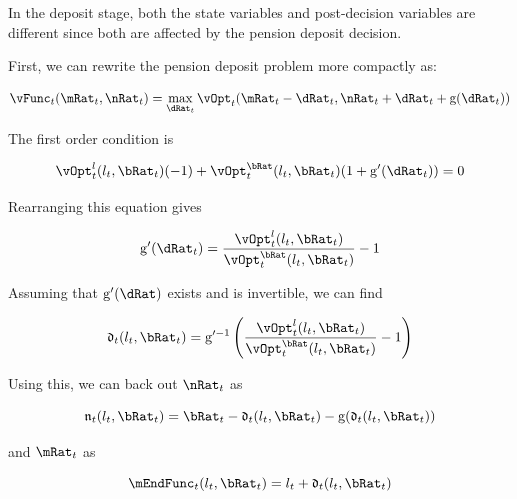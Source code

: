 \documentclass[\econtexRoot/EGMN]{subfiles}
\begin{document}
\providecommand{\gFunc}{\ensuremath{\mathrm{g}}}


In the deposit stage, both the state variables and post-decision variables are different since both are affected by the pension deposit decision.

First, we can rewrite the pension deposit problem more compactly as:

\begin{equation}
    \vFunc_{t}(\mRat_{t}, \nRat_{t}) = \max_{\dRat_{t}}
    \vOpt_{t}(\mRat_{t}
    - \dRat_{t}, \nRat_{t} + \dRat_{t} + \gFunc(\dRat_{t}))
\end{equation}

The first order condition is

\begin{equation}
    \vOpt_{t}^{\lRat}(\lRat_{t}, \bRat_{t})(-1) +
    \vOpt_{t}^{\bRat}(\lRat_{t}, \bRat_{t})(1+\gFunc'(\dRat_{t})) = 0
\end{equation}

Rearranging this equation gives

\begin{equation}
    \gFunc'(\dRat_{t}) = \frac{\vOpt_{t}^{\lRat}(\lRat_{t},
        \bRat_{t})}{\vOpt_{t}^{\bRat}(\lRat_{t}, \bRat_{t})} - 1
\end{equation}

Assuming that $\gFunc'(\dRat)$ exists and is invertible, we can find

\providecommand{\dEndFunc}{\ensuremath{\mathfrak{d}}}

\begin{equation}
    \dEndFunc_{t}(\lRat_{t}, \bRat_{t}) = \gFunc'^{-1}\left(
    \frac{\vOpt_{t}^{\lRat}(\lRat_{t},
        \bRat_{t})}{\vOpt_{t}^{\bRat}(\lRat_{t},
        \bRat_{t})} - 1 \right)
\end{equation}

Using this, we can back out $\nRat_{t}$ as

\providecommand{\nEndFunc}{\ensuremath{\mathfrak{n}}}

\begin{equation}
    \nEndFunc_{t}(\lRat_{t}, \bRat_{t}) = \bRat_{t} -
    \dEndFunc_{t}(\lRat_{t}, \bRat_{t}) - \gFunc(\dEndFunc_{t}(\lRat_{t},
        \bRat_{t}))
\end{equation}

and $\mRat_{t}$ as

\begin{equation}
    \mEndFunc_{t}(\lRat_{t}, \bRat_{t}) = \lRat_{t} +
    \dEndFunc_{t}(\lRat_{t}, \bRat_{t})
\end{equation}
\end{document}
